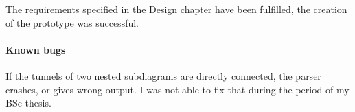 The requirements specified in the Design chapter have been fulfilled, the creation of the prototype was successful.

\paragraph{Known bugs} If the tunnels of two nested subdiagrams are directly connected, the parser crashes, or gives wrong output. I was not able to fix that during the period of my BSc thesis.



\begin{table}[ht]


\end{table}
